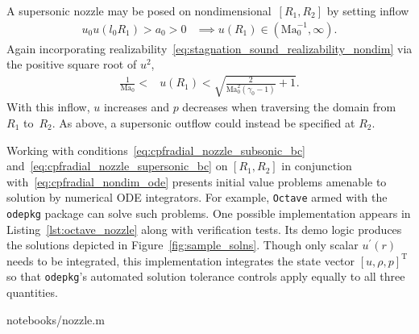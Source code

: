 \documentclass[letterpaper,11pt,nointlimits,reqno]{amsart}
\newcommand{\Mach}[1][]{\mbox{Ma}_{#1}}
\begin{document}
A supersonic nozzle may be posed on nondimensional~$\left[R_{1}, R_{2}\right]$
by setting inflow
\begin{align}
   u_0 u\!\left(l_0 R_{1}\right) > a_0 > 0
   &\implies
   u\!\left(R_{1}\right) \in \left(\Mach[0]^{-1}, \infty\right)
.
\end{align}
Again incorporating
realizability~\eqref{eq:stagnation_sound_realizability_nondim} via the positive
square root of $u^2$,
\begin{align}
  \frac{1}{\Mach[0]} < &u\!\left(R_1\right)
  < \sqrt{\frac{2}{\Mach[0]^2\left(\gamma_0-1\right)}+1}
\label{eq:cpfradial_nozzle_supersonic_bc}
.
\end{align}
With this inflow, $u$ increases and $p$ decreases when traversing the domain
from~$R_{1}$ to~$R_{2}$.  As above, a supersonic outflow could instead be
specified at $R_{2}$.

Working with conditions~\eqref{eq:cpfradial_nozzle_subsonic_bc}
and~\eqref{eq:cpfradial_nozzle_supersonic_bc} on $\left[R_1, R_2\right]$ in
conjunction with~\eqref{eq:cpfradial_nondim_ode} presents initial value
problems amenable to solution by numerical ODE integrators.  For example,
\texttt{Octave}\citep{Eaton2008GNU} armed with the \texttt{odepkg} package can
solve such problems.  One possible implementation appears in
Listing~\ref{lst:octave_nozzle} along with verification tests.  Its demo logic
produces the solutions depicted in Figure~\ref{fig:sample_solns}.  Though only
scalar $u^\prime\!\left(r\right)$ needs to be integrated, this implementation
integrates the state vector $\left[u, \rho, p\right]^\mathrm{T}$ so that
\texttt{odepkg}'s automated solution tolerance controls apply equally to all
three quantities.


                {notebooks/nozzle.m}
\end{document}
